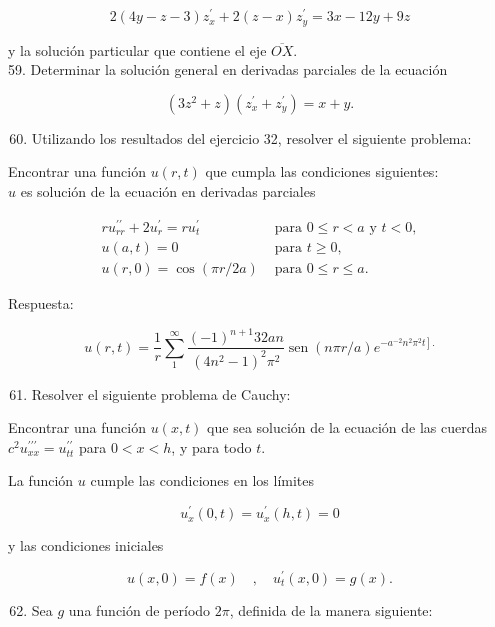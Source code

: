 \documentclass[10pt]{article}
\theoremstyle{plain}
\theoremstyle{definition}
\theoremstyle{remark}
\begin{document}
$$
2(4 y-z-3) z_{x}^{\prime}+2(z-x) z_{y}^{\prime}=3 x-12 y+9 z
$$

y la solución particular que contiene el eje $\overline{O X}$.\\
59. Determinar la solución general en derivadas parciales de la ecuación

$$
\left(3 z^{2}+z\right)\left(z_{x}^{\prime}+z_{y}^{\prime}\right)=x+y .
$$

\begin{enumerate}
  \setcounter{enumi}{59}
  \item Utilizando los resultados del ejercicio 32, resolver el siguiente problema:
\end{enumerate}

Encontrar una función $u(r, t)$ que cumpla las condiciones siguientes:\\
$u$ es solución de la ecuación en derivadas parciales

$$
\begin{array}{ll}
r u_{r r}^{\prime \prime}+2 u_{r}^{\prime}=r u_{t}^{\prime} & \text { para } 0 \leqslant r<a \text { y } t<0, \\
u(a, t)=0 & \text { para } t \geqslant 0, \\
u(r, 0)=\cos (\pi r / 2 a) & \text { para } 0 \leqslant r \leqslant a .
\end{array}
$$

Respuesta:

$$
u(r, t)=\frac{1}{r} \sum_{1}^{\infty} \frac{(-1)^{n+1} 32 a n}{\left(4 n^{2}-1\right)^{2} \pi^{2}} \operatorname{sen}(n \pi r / a) e^{\left.-a^{-2} n^{2} \pi^{2} t\right] .}
$$

\begin{enumerate}
  \setcounter{enumi}{60}
  \item Resolver el siguiente problema de Cauchy:
\end{enumerate}

Encontrar una función $u(x, t)$ que sea solución de la ecuación de las cuerdas $c^{2} u_{x x}^{\prime \prime \prime}=u_{t t}^{\prime \prime}$ para $0<x<h$, y para todo $t$.

La función $u$ cumple las condiciones en los límites

$$
u_{x}^{\prime}(0, t)=u_{x}^{\prime}(h, t)=0
$$

y las condiciones iniciales

$$
u(x, 0)=f(x) \quad, \quad u_{t}^{\prime}(x, 0)=g(x) .
$$

\begin{enumerate}
  \setcounter{enumi}{61}
  \item Sea $g$ una función de período $2 \pi$, definida de la manera siguiente:
\end{enumerate}
\end{document}
